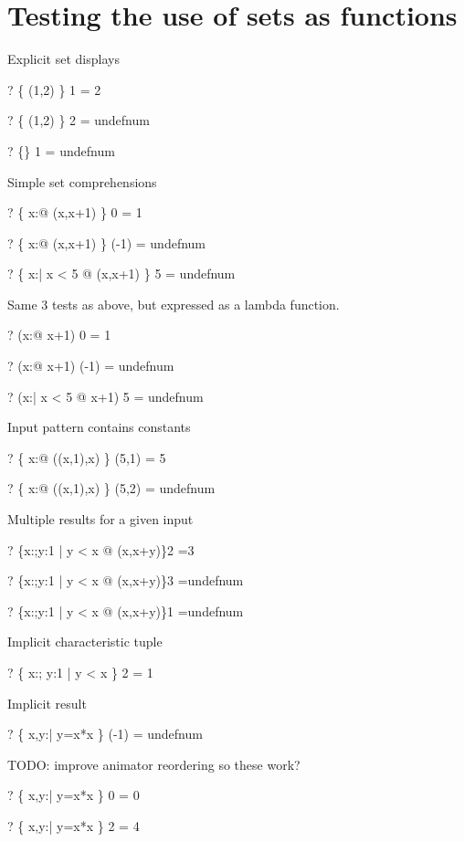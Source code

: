 \documentclass{article}
\newcommand{\negate}{-}
\begin{document}
\section{Testing the use of sets as functions}
Explicit set displays
\begin{zed} \vdash?   \{ (1,2) \} 1 = 2 \end{zed}
\begin{zed} \vdash?  \{ (1,2) \} 2 = undefnum \end{zed}
\begin{zed} \vdash?  \{\} 1 = undefnum \end{zed}
Simple set comprehensions
\begin{zed} \vdash?   \{ x:\nat @ (x,x+1) \} 0 = 1 \end{zed}
\begin{zed} \vdash?  \{ x:\nat @ (x,x+1) \} (\negate 1) = undefnum \end{zed}
\begin{zed} \vdash?  \{ x:\nat | x < 5 @ (x,x+1) \} 5 = undefnum \end{zed}
Same 3 tests as above, but expressed as a lambda function.
\begin{zed} \vdash?   (\lambda x:\nat @ x+1) 0 = 1 \end{zed}
\begin{zed} \vdash?  (\lambda x:\nat @ x+1) (\negate 1) = undefnum \end{zed}
\begin{zed} \vdash?  (\lambda x:\nat | x < 5 @ x+1) 5 = undefnum \end{zed}
Input pattern contains constants
\begin{zed} \vdash?   \{ x:\nat @ ((x,1),x) \} (5,1) = 5 \end{zed}
\begin{zed} \vdash?  \{ x:\nat @ ((x,1),x) \} (5,2) = undefnum \end{zed}
Multiple results for a given input
\begin{zed}\vdash? \{x:\nat;y:1  | y < x @ (x,x+y)\}2 =3\end{zed}
\begin{zed}\vdash? \{x:\nat;y:1  | y < x @ (x,x+y)\}3 =undefnum\end{zed}
\begin{zed}\vdash? \{x:\nat;y:1  | y < x @ (x,x+y)\}1 =undefnum\end{zed}
Implicit characteristic tuple
\begin{zed} \vdash?   \{ x:\nat; y:1  | y < x \} 2 = 1 \end{zed}
Implicit result
\begin{zed} \vdash?  \{ x,y:\nat | y=x*x \} (\negate1) = undefnum \end{zed}
TODO: improve animator reordering so these work?
\begin{zed} \vdash?   \{ x,y:\nat | y=x*x \} 0 = 0 \end{zed}
\begin{zed} \vdash?   \{ x,y:\nat | y=x*x \} 2 = 4 \end{zed}
\end{document}
